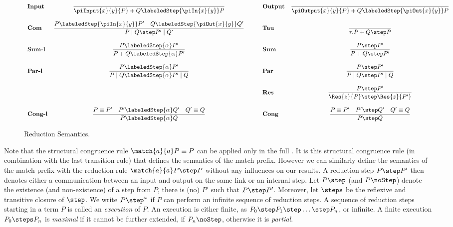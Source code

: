 \documentclass[]{article}
\begin{document}
\begin{figure}[t]
	\begin{align*}
		\begin{array}{l@{\quad}c@{\hspace{3em}}l@{\quad}c}
			\textbf{Input} & \dfrac{}{\piInput{x}{y}{P} + Q \labeledStep{\piIn{x}{y}} P} & \textbf{Output} & \dfrac{}{\piOutput{x}{y}{P} + Q \labeledStep{\piOut{x}{y}} P}\\
			\\
			\textbf{Com} & \dfrac{P \labeledStep{\piIn{x}{y}} P' \quad Q \labeledStep{\piOut{x}{y}} Q'}{P \mid Q \step P' \mid Q'} & \textbf{Tau} & \dfrac{}{\tau.P + Q \step P}\\
			\\
			\textbf{Sum-l} & \dfrac{P \labeledStep{\alpha} P'}{P + Q \labeledStep{\alpha} P'} & \textbf{Sum} & \dfrac{P \step P'}{P + Q \step P'}\\
			\\
			\textbf{Par-l} & \dfrac{P \labeledStep{\alpha} P'}{P \mid Q \labeledStep{\alpha} P' \mid Q} & \textbf{Par} & \dfrac{P \step P'}{P \mid Q \step P' \mid Q}\\
			\\
			& & \textbf{Res} & \dfrac{P \step P'}{\Res{z}{P} \step \Res{z}{P'}}\\
			\\
			\textbf{Cong-l} & \dfrac{P \equiv P' \quad P' \labeledStep{\alpha} Q' \quad Q' \equiv Q}{P \labeledStep{\alpha} Q} & \textbf{Cong} & \dfrac{P \equiv P' \quad P' \step Q' \quad Q' \equiv Q}{P \step Q}
		\end{array}
	\end{align*}
	\caption{Reduction Semantics.}
	\label{fig:reductionSemantics}
\end{figure}

Note that the structural congruence rule $ \match{a}{a}P \equiv P $ can be applied only in the full \piCal. It is this structural congruence rule (in combination with the last transition rule) that defines the semantics of the match prefix. However we can similarly define the semantics of the match prefix with the reduction rule $ \match{a}{a}P \step P $ without any influences on our results.
A reduction step $ P \step P' $ then denotes either a communication between an input and output on the same link or an internal step.
Let $ P \step $ (and $ P \noStep $) denote the existence (and non-existence) of a step from $ P $, \ie there is (no) $ P' $ such that $ P \step P' $. Moreover, let $ \steps $ be the reflexive and transitive closure of $ \step $. We write $ P \step^{\omega} $ if $ P $ can perform an infinite sequence of reduction steps. A sequence of reduction steps starting in a term $ P $ is called an \emph{execution} of $ P $. An execution is either finite, as $ P_0 \step P_1 \step \ldots \step P_n $, or infinite. A finite execution $ P_0 \steps P_n $ is \emph{maximal} if it cannot be further extended, \ie if $ P_n \noStep $, otherwise it is \emph{partial}.
\end{document}
